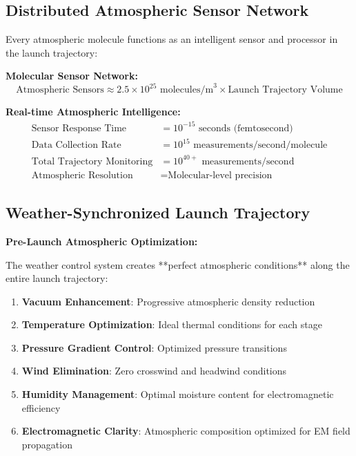 \documentclass[12pt,a4paper]{article}
\begin{document}
\subsection{Distributed Atmospheric Sensor Network}

Every atmospheric molecule functions as an intelligent sensor and processor in the launch trajectory:

\textbf{Molecular Sensor Network:}
\begin{equation}
\text{Atmospheric Sensors} \approx 2.5 \times 10^{25} \text{ molecules/m}^3 \times \text{Launch Trajectory Volume}
\end{equation}

\textbf{Real-time Atmospheric Intelligence:}
\begin{align}
\text{Sensor Response Time} &= 10^{-15} \text{ seconds (femtosecond)} \\
\text{Data Collection Rate} &= 10^{15} \text{ measurements/second/molecule} \\
\text{Total Trajectory Monitoring} &= 10^{40+} \text{ measurements/second} \\
\text{Atmospheric Resolution} &= \text{Molecular-level precision}
\end{align}

\subsection{Weather-Synchronized Launch Trajectory}

\textbf{Pre-Launch Atmospheric Optimization:}

The weather control system creates **perfect atmospheric conditions** along the entire launch trajectory:

\begin{enumerate}
\item \textbf{Vacuum Enhancement}: Progressive atmospheric density reduction
\item \textbf{Temperature Optimization}: Ideal thermal conditions for each stage
\item \textbf{Pressure Gradient Control}: Optimized pressure transitions
\item \textbf{Wind Elimination}: Zero crosswind and headwind conditions
\item \textbf{Humidity Management}: Optimal moisture content for electromagnetic efficiency
\item \textbf{Electromagnetic Clarity}: Atmospheric composition optimized for EM field propagation
\end{enumerate}
\end{document}
